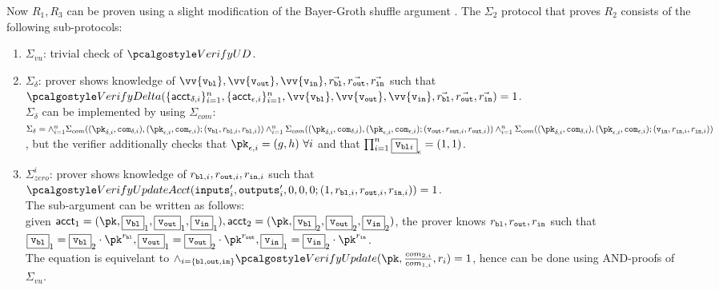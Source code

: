 Now $R_1, R_3$ can be proven using a slight modification of the Bayer-Groth shuffle argument \cite{Bayer-GrothShuffle}.
The $\Sigma_2$ protocol that proves $R_2$ consists of the following sub-protocols:
\begin{enumerate}
    \item $\Sigma_{vu}$: trivial check of $\verupddelta$.
    
    \item $\Sigma_{\delta}$: prover shows knowledge of $\vv{\vbl}, \vv{\vout}, \vv{\vin}, \vec{r_{\varbl}}, \vec{r_{\varout}}, \vec{r_{\varin}}$ such that \\
     $\verdelta(\{\acct_{\delta,i}\}_{i=1}^{n}, \{\acct_{\epsilon,i}\}_{i=1}^{n}, \vv{\vbl}, \vv{\vout}, \vv{\vin}, \vec{r_{\varbl}}, \vec{r_{\varout}}, \vec{r_{\varin}}) = 1$. \\
     $\Sigma_{\delta}$ can be implemented by using $\Sigma_{com}$: \\
     $\Sigma_{\delta} = \land_{i=1}^n \Sigma_{com}((\pk_{\delta,i}, \com_{\delta,i}), (\pk_{\epsilon,i}, \com_{\epsilon,i}); (\vbl, r_{\varbl,i}, r_{\varbl,i})) \\
     \land_{i=1}^n \Sigma_{com}((\pk_{\delta,i}, \com_{\delta,i}), (\pk_{\epsilon,i}, \com_{\epsilon,i}); (\vout, r_{\varout,i}, r_{\varout,i})) \\
     \land_{i=1}^n \Sigma_{com}((\pk_{\delta,i}, \com_{\delta,i}), (\pk_{\epsilon,i}, \com_{\epsilon,i}); (\vin, r_{\varin,i}, r_{\varin,i}))$
     , but the verifier additionally checks that $\pk_{\epsilon,i} = (g,h) \ \forall i$ and that $\prod_{i=1}^n \fbox{${\textup{\texttt{{v}}}_{\textup{\texttt{{bl}}}}}_i$}_{\epsilon} = (1,1)$.

     \item $\Sigma^{i}_{zero}$: prover shows knowledge of $r_{\textup{\texttt{{bl}}},i}, r_{\textup{\texttt{{out}}},i}, r_{\textup{\texttt{{in}}},i}$ such that \\ 
     $\verupdacc(\inputs'_i, \outputs'_i, 0,0,0;(1, r_{\varbl,i}, r_{\varout,i}, r_{\varin,i})) = 1$. \\ 
     The sub-argument can be written as follows: \\
     given $\acct_1 = (\pk, \comm{\vbl}_1, \comm{\vout}_1, \comm{\vin}_1), \acct_2 = (\pk, \comm{\vbl}_2, \comm{\vout}_2, \comm{\vin}_2)$, the prover knows $r_{\textup{\texttt{{bl}}}}, r_{\textup{\texttt{{out}}}}, r_{\textup{\texttt{{in}}}}$ such that $\comm{\vbl}_1 = \comm{\vbl}_2 \cdot \pk^{r_{\varbl}}, \comm{\vout}_1 = \comm{\vout}_2 \cdot \pk^{r_{\varout}}, \comm{\vin}_1 = \comm{\vin}_2 \cdot \pk^{r_{\varin}}$. \\ The equation is equivelant to $\land_{i=\{\varbl, \varout, \varin\}}\verupd(\pk, \frac{com_{2,i}}{com_{1,i}}, r_i) = 1$, hence can be done using AND-proofs of $\Sigma_{vu}$. 


\end{enumerate}
